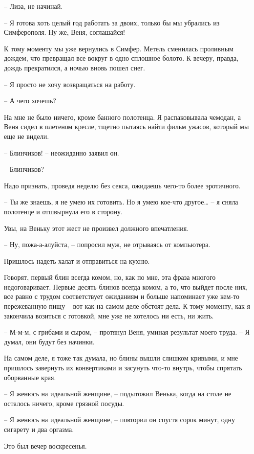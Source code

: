 \documentclass[
]{book}
\begin{document}
-- Лиза, не начинай.

-- Я готова хоть целый год работать за двоих, только бы мы убрались из Симферополя. Ну же, Веня, соглашайся!

К тому моменту мы уже вернулись в Симфер. Метель сменилась проливным дождем, что превращал все вокруг в одно сплошное болото. К вечеру, правда, дождь прекратился, а ночью вновь пошел снег.

-- Я просто не хочу возвращаться на работу.

-- А чего хочешь?

На мне не было ничего, кроме банного полотенца. Я распаковывала чемодан, а Веня сидел в плетеном кресле, тщетно пытаясь найти фильм ужасов, который мы еще не видели.

-- Блинчиков! -- неожиданно заявил он.

-- Блинчиков?

Надо признать, проведя неделю без секса, ожидаешь чего-то более эротичного.

-- Ты же знаешь, я не умею их готовить. Но я умею кое-что другое\ldots{} -- я сняла полотенце и отшвырнула его в сторону.

Увы, на Веньку этот жест не произвел должного впечатления.

-- Ну, пожа-а-алуйста, -- попросил муж, не отрываясь от компьютера.

Пришлось надеть халат и отправиться на кухню.

Говорят, первый блин всегда комом, но, как по мне, эта фраза многого недоговаривает. Первые десять блинов всегда комом, а то, что выйдет после них, все равно с трудом соответствует ожиданиям и больше напоминает уже кем-то пережеванную пищу -- вот как на самом деле обстоят дела. К тому моменту, как я закончила возиться с готовкой, мне уже не хотелось ни есть, ни жить.

-- М-м-м, с грибами и сыром, -- протянул Веня, уминая результат моего труда. -- Я думал, они будут без начинки.

На самом деле, я тоже так думала, но блины вышли слишком кривыми, и мне пришлось завернуть их конвертиками и засунуть что-то внутрь, чтобы спрятать оборванные края.

-- Я женюсь на идеальной женщине, -- подытожил Венька, когда на столе не осталось ничего, кроме грязной посуды.

-- Я женюсь на идеальной женщине, -- повторил он спустя сорок минут, одну сигарету и два оргазма.

Это был вечер воскресенья.
\end{document}
